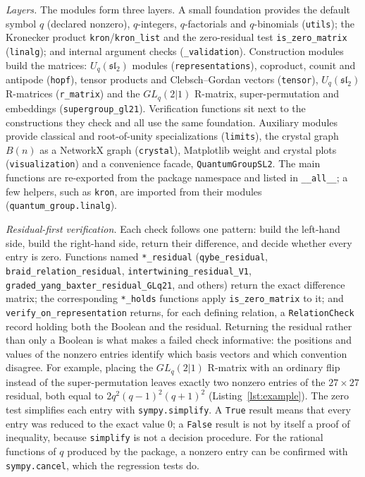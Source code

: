 \documentclass[11pt,a4paper]{article}
\newcommand{\code}[1]{\texttt{#1}}
\newcommand{\Uq}{U_q(\mathfrak{sl}_2)}
\newcommand{\GL}{GL_q(2|1)}
\begin{document}
\emph{Layers.} The modules form three layers. A small foundation provides the default symbol $q$ (declared nonzero), $q$-integers, $q$-factorials and $q$-binomials (\code{utils}); the Kronecker product \code{kron}/\code{kron\_list} and the zero-residual test \code{is\_zero\_matrix} (\code{linalg}); and internal argument checks (\code{\_validation}). Construction modules build the matrices: $\Uq$ modules (\code{representations}), coproduct, counit and antipode (\code{hopf}), tensor products and Clebsch--Gordan vectors (\code{tensor}), $\Uq$ R-matrices (\code{r\_matrix}) and the $\GL$ R-matrix, super-permutation and embeddings (\code{supergroup\_gl21}). Verification functions sit next to the constructions they check and all use the same foundation. Auxiliary modules provide classical and root-of-unity specializations (\code{limits}), the crystal graph $B(n)$ as a NetworkX \cite{hagberg2008networkx} graph (\code{crystal}), Matplotlib \cite{hunter2007matplotlib} weight and crystal plots (\code{visualization}) and a convenience facade, \code{QuantumGroupSL2}. The main functions are re-exported from the package namespace and listed in \code{\_\_all\_\_}; a few helpers, such as \code{kron}, are imported from their modules (\code{quantum\_group.linalg}).

\emph{Residual-first verification.} Each check follows one pattern: build the left-hand side, build the right-hand side, return their difference, and decide whether every entry is zero. Functions named \code{*\_residual} (\code{qybe\_residual}, \code{braid\_relation\_residual}, \code{intertwining\_residual\_V1}, \code{graded\_yang\_baxter\_residual\_GLq21}, and others) return the exact difference matrix; the corresponding \code{*\_holds} functions apply \code{is\_zero\_matrix} to it; and \code{verify\_on\_representation} returns, for each defining relation, a \code{RelationCheck} record holding both the Boolean and the residual. Returning the residual rather than only a Boolean is what makes a failed check informative: the positions and values of the nonzero entries identify which basis vectors and which convention disagree. For example, placing the $\GL$ R-matrix with an ordinary flip instead of the super-permutation leaves exactly two nonzero entries of the $27\times27$ residual, both equal to $2q^2(q-1)^2(q+1)^2$ (Listing~\ref{lst:example}). The zero test simplifies each entry with \code{sympy.simplify}. A \code{True} result means that every entry was reduced to the exact value 0; a \code{False} result is not by itself a proof of inequality, because \code{simplify} is not a decision procedure. For the rational functions of $q$ produced by the package, a nonzero entry can be confirmed with \code{sympy.cancel}, which the regression tests do.
\end{document}
